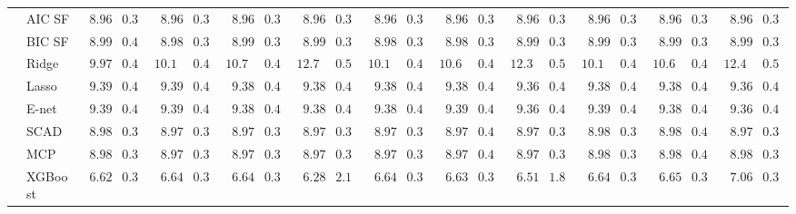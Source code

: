 \begin{tabular}{p{0.2cm}p{1cm}|p{0.6cm}p{0.6cm}|p{0.6cm}p{0.6cm}p{0.6cm}p{0.6cm}p{0.6cm}p{0.6cm}|p{0.6cm}p{0.6cm}p{0.6cm}p{0.6cm}p{0.6cm}p{0.6cm}|p{0.6cm}p{0.6cm}p{0.6cm}p{0.6cm}p{0.6cm}p{0.6cm}}
 & AIC SF  & $\phantom{0}8.96$ & $0.39$ & $\phantom{0}8.96$ & $0.39$ & $\phantom{0}8.96$ & $0.39$ & $\phantom{0}8.96$ & $0.39$ & $\phantom{0}8.96$ & $0.39$ & $\phantom{0}8.96$ & $0.39$ & $\phantom{0}8.96$ & $0.39$ & $\phantom{0}8.96$ & $0.39$ & $\phantom{0}8.96$ & $0.39$ & $\phantom{0}8.96$ & $0.39$ \\
 & BIC SF  & $\phantom{0}8.99$ & $0.40$ & $\phantom{0}8.98$ & $0.39$ & $\phantom{0}8.99$ & $0.39$ & $\phantom{0}8.99$ & $0.39$ & $\phantom{0}8.98$ & $0.39$ & $\phantom{0}8.98$ & $0.39$ & $\phantom{0}8.99$ & $0.39$ & $\phantom{0}8.99$ & $0.39$ & $\phantom{0}8.99$ & $0.39$ & $\phantom{0}8.99$ & $0.39$ \\
 & Ridge  & $\phantom{0}9.97$ & $0.43$ & $10.14$ & $0.42$ & $10.76$ & $0.45$ & $12.74$ & $0.51$ & $10.14$ & $0.42$ & $10.66$ & $0.43$ & $12.39$ & $0.52$ & $10.13$ & $0.42$ & $10.65$ & $0.44$ & $12.49$ & $0.50$ \\
 & Lasso  & $\phantom{0}9.39$ & $0.42$ & $\phantom{0}9.39$ & $0.42$ & $\phantom{0}9.38$ & $0.42$ & $\phantom{0}9.38$ & $0.42$ & $\phantom{0}9.38$ & $0.41$ & $\phantom{0}9.38$ & $0.41$ & $\phantom{0}9.36$ & $0.42$ & $\phantom{0}9.38$ & $0.41$ & $\phantom{0}9.38$ & $0.41$ & $\phantom{0}9.36$ & $0.42$ \\
 & E-net  & $\phantom{0}9.39$ & $0.42$ & $\phantom{0}9.39$ & $0.42$ & $\phantom{0}9.38$ & $0.42$ & $\phantom{0}9.38$ & $0.42$ & $\phantom{0}9.38$ & $0.42$ & $\phantom{0}9.39$ & $0.41$ & $\phantom{0}9.36$ & $0.42$ & $\phantom{0}9.39$ & $0.41$ & $\phantom{0}9.38$ & $0.42$ & $\phantom{0}9.36$ & $0.41$ \\
 & SCAD  & $\phantom{0}8.98$ & $0.39$ & $\phantom{0}8.97$ & $0.39$ & $\phantom{0}8.97$ & $0.39$ & $\phantom{0}8.97$ & $0.39$ & $\phantom{0}8.97$ & $0.39$ & $\phantom{0}8.97$ & $0.40$ & $\phantom{0}8.97$ & $0.39$ & $\phantom{0}8.98$ & $0.39$ & $\phantom{0}8.98$ & $0.40$ & $\phantom{0}8.97$ & $0.39$ \\
 & MCP  & $\phantom{0}8.98$ & $0.39$ & $\phantom{0}8.97$ & $0.39$ & $\phantom{0}8.97$ & $0.39$ & $\phantom{0}8.97$ & $0.39$ & $\phantom{0}8.97$ & $0.39$ & $\phantom{0}8.97$ & $0.40$ & $\phantom{0}8.97$ & $0.39$ & $\phantom{0}8.98$ & $0.39$ & $\phantom{0}8.98$ & $0.40$ & $\phantom{0}8.98$ & $0.39$ \\
 & XGBoost  & $\phantom{0}6.62$ & $0.33$ & $\phantom{0}6.64$ & $0.33$ & $\phantom{0}6.64$ & $0.30$ & $\phantom{0}6.28$ & $2.18$ & $\phantom{0}6.64$ & $0.35$ & $\phantom{0}6.63$ & $0.32$ & $\phantom{0}6.51$ & $1.88$ & $\phantom{0}6.64$ & $0.31$ & $\phantom{0}6.65$ & $0.33$ & $\phantom{0}7.06$ & $0.34$ \\

\end{tabular}

